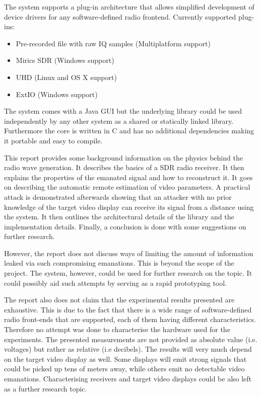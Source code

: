\documentclass[a4paper,12pt,twoside,openright]{report}
\begin{document}
The system supports a plug-in architecture that allows simplified development of device drivers for any software-defined radio frontend. Currently supported plug-ins:

\begin{itemize}

  \item Pre-recorded file with raw IQ samples (Multiplatform support)
  \item Mirics SDR (Windows support)
  \item UHD (Linux and OS X support)
  \item ExtIO (Windows support)

\end{itemize}

The system comes with a Java GUI but the underlying library could be used independently by any other system as a shared or statically linked library. Furthermore the core is written in C and has no additional dependencies making it portable and easy to compile.

This report provides some background information on the physics behind the radio wave generation. It describes the basics of a SDR radio receiver. It then explains the properties of the emanated signal and how to reconstruct it. It goes on describing the automatic remote estimation of video parameters. A practical attack is demonstrated afterwards showing that an attacker with no prior knowledge of the target video display can receive its signal from a distance using the system. It then outlines the architectural details of the library and the implementation details. Finally, a conclusion is done with some suggestions on further research.

However, the report does not discuss ways of limiting the amount of information leaked via such compromising emanations. This is beyond the scope of the project. The system, however, could be used for further research on the topic. It could possibly aid such attempts by serving as a rapid prototyping tool.

The report also does not claim that the experimental results presented are exhaustive. This is due to the fact that there is a wide range of software-defined radio front-ends that are supported, each of them having different characteristics. Therefore no attempt was done to characterise the hardware used for the experiments. The presented measurements are not provided as absolute value (i.e. voltages) but rather as relative (i.e decibels). The results will very much depend on the target video display as well. Some displays will emit strong signals that could be picked up tens of meters away, while others emit no detectable video emanations. Characterising receivers and target video displays could be also left as a further research topic.
\end{document}
